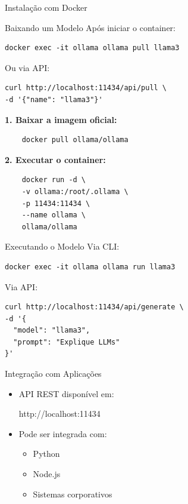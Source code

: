 \documentclass{beamer}
\begin{document}
\begin{frame}{Instalação com Docker}

\end{frame}

\begin{frame}{Baixando um Modelo}
Após iniciar o container:

\begin{verbatim}
docker exec -it ollama ollama pull llama3
\end{verbatim}

Ou via API:
\begin{verbatim}
curl http://localhost:11434/api/pull \
-d '{"name": "llama3"}'
\end{verbatim}
\textbf{1. Baixar a imagem oficial:}
\begin{verbatim}
    docker pull ollama/ollama
\end{verbatim}

\textbf{2. Executar o container:}
\begin{verbatim}
    docker run -d \
    -v ollama:/root/.ollama \
    -p 11434:11434 \
    --name ollama \
    ollama/ollama
    \end{verbatim}\end{frame}

\begin{frame}{Executando o Modelo}
Via CLI:

\begin{verbatim}
docker exec -it ollama ollama run llama3
\end{verbatim}

Via API:

\begin{verbatim}
curl http://localhost:11434/api/generate \
-d '{
  "model": "llama3",
  "prompt": "Explique LLMs"
}'
\end{verbatim}
\end{frame}

\begin{frame}{Integração com Aplicações}
    \begin{itemize}
        \item API REST disponível em:
        \begin{center}
        http://localhost:11434
        \end{center}
        \item Pode ser integrada com:
        \begin{itemize}
            \item Python
            \item Node.js
            \item Sistemas corporativos
        \end{itemize}
    \end{itemize}
\end{frame}
\end{document}
